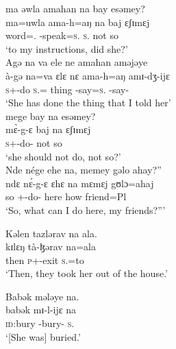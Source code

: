  \medskip
 ma  əwla  amahan  na  bay  esəmey?\\
 \gll ma=uwla      ama-h=aŋ  na  baj    ɛʃɪmɛj\\
 word={\oneS}.{\POSS}  {\DEP}-speak=\textsc{s}.{\IO}   \textsc{s}.{\DO}   {\NEG}   {not so}\\
 \glt ‘to my instructions, did she?’ \\
 
 \medskip
 Agə  na  va  ele  ne  amahan  aməjəye  \\
 \gll à-gə na=va       ɛlɛ      nɛ    ama-h=aŋ  amɪ-dʒ-ijɛ  \\
 \textsc{s}+{\PFV}-do  \textsc{s}.{\DO}={\PRF}  thing  {\oneS}  {\DEP}-say=\textsc{s}.{\IO}  {\DEP}-say-{\CL}      \\
 \glt ‘She has done the thing that I told her’\\
 
 \medskip
 mege  bay  na  esəmey?\\
 \gll m\`ɛ-g-ɛ            baj  na     ɛʃɪmɛj\\
 \textsc{s}+{\HOR}-do-{\CL}  {\NEG}   {\PSP}  {not so}\\
 \glt ‘she should not do, not so?’\\
 
 \medskip
 Nde  nége  ehe  na,  memey  gəlo  ahay?” \\
 \gll ndɛ   n\'ɛ-g-ɛ    ɛhɛ     na     mɛmɛj  gʊlɔ=ahaj\\
 so  {\oneS}+{\IFV}-do{}-{\CL}  here   {\PSP}  how     friend=Pl\\
 \glt ‘So, what can I do here, my friends?”’\\
 \z
 
 \ea  Kəlen  tazlərav   na  ala.    \\
 \gll kɪlɛŋ  tà-ɮərav          na=ala    \\
 then    \textsc{p}+{\PFV}-exit  \textsc{s}.{\DO}=to \\
 \glt ‘Then, they took her out of the house.’
 \z
 
 \ea  Babək  mələye  na.\\
\gll babək   mɪ-l-ijɛ        na\\
 \textsc{id}:bury  {\NOM}-bury-{\CL}  \textsc{s}.{\DO}\\
 \glt ‘[She was] buried.’
 \z
 
